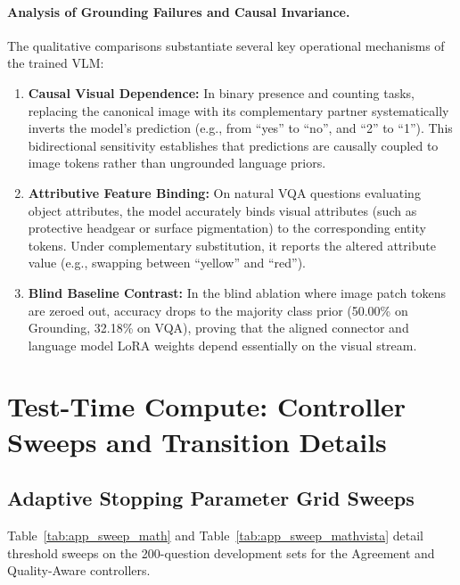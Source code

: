 \documentclass{article}
\begin{document}
\paragraph{Analysis of Grounding Failures and Causal Invariance.}
The qualitative comparisons substantiate several key operational mechanisms of the trained VLM:
\begin{enumerate}[leftmargin=*]
    \item \textbf{Causal Visual Dependence:} In binary presence and counting tasks, replacing the canonical image with its complementary partner systematically inverts the model's prediction (e.g., from ``yes'' to ``no'', and ``2'' to ``1''). This bidirectional sensitivity establishes that predictions are causally coupled to image tokens rather than ungrounded language priors.
    \item \textbf{Attributive Feature Binding:} On natural VQA questions evaluating object attributes, the model accurately binds visual attributes (such as protective headgear or surface pigmentation) to the corresponding entity tokens. Under complementary substitution, it reports the altered attribute value (e.g., swapping between ``yellow'' and ``red'').
    \item \textbf{Blind Baseline Contrast:} In the blind ablation where image patch tokens are zeroed out, accuracy drops to the majority class prior (50.00\% on Grounding, 32.18\% on VQA), proving that the aligned connector and language model LoRA weights depend essentially on the visual stream.
\end{enumerate}

\clearpage
\section{Test-Time Compute: Controller Sweeps and Transition Details}
\label{app:task3_extended}

\subsection{Adaptive Stopping Parameter Grid Sweeps}
Table~\ref{tab:app_sweep_math} and Table~\ref{tab:app_sweep_mathvista} detail threshold sweeps on the 200-question development sets for the Agreement and Quality-Aware controllers.
\end{document}
